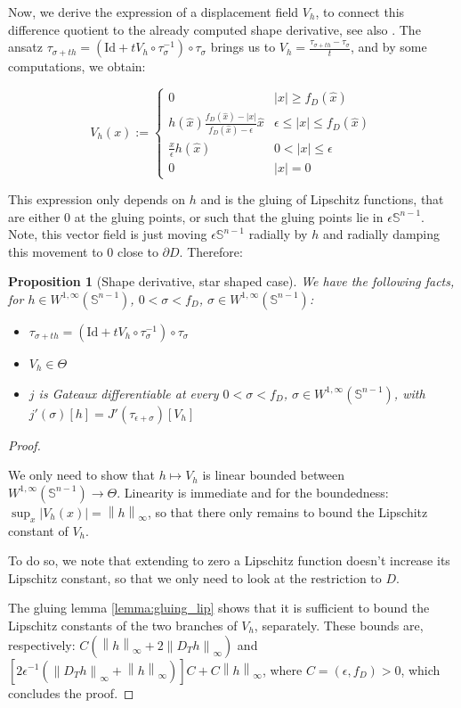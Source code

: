 \documentclass[english,a4paper,9pt,oneside]{scrbook}	%
\theoremstyle{break}
\newtheorem{prop}[equation]{Proposition}
\newenvironment{mproof}[1][\proofname]{%
  \begin{proof}[#1]$ $\par\nobreak\ignorespaces
}{%
  \end{proof}
}
\renewcommand*{\proofname}{Proof}
\theoremstyle{remark}
\newcommand{\mS}{\mathbb{S}^{n-1}}
\newcommand{\ds}{\displaystyle}
\newcommand{\norm}[1]{\left\lVert#1\right\rVert}
\newcommand{\id}{\text{Id}}
\newcommand{\Te}{\Theta}
\newcommand{\xh}{\hat{x}}
\newcommand{\eps}{\epsilon}
\begin{document}
Now, we derive the expression of a displacement field $V_h$, to connect this difference quotient to the already computed shape derivative, see also \cite{deckelnick}. The ansatz $\tau_{\sigma+th}=(\id + tV_h\circ \tau_\sigma^{-1})\circ \tau_\sigma$ brings us to $V_h = \ds \frac{\tau_{\sigma+th}-\tau_\sigma}{t}$, and by some computations, we obtain: 

$$V_h(x) :=\left\{\begin{matrix}
 0 & |x|\geq f_D(\xh)\\ 
 h(\xh)\frac{f_D(\xh)-|x|}{f_D(\xh)-\eps}\xh & \eps \leq |x| \leq f_D(\xh) \\ 
 \frac{x}{\epsilon}h(\hat{x}) & 0<|x|\leq \eps\\ 
 0 & |x|=0
\end{matrix}\right.$$

This expression only depends on $h$ and is the gluing of Lipschitz functions, that are either $0$ at the gluing points, or such that the gluing points lie in $\eps\mS$. Note, this vector field is just moving $\eps \mS$ radially by $h$ and radially damping this movement to $0$ close to $\partial D$. Therefore:

\begin{prop}[Shape derivative, star shaped case]
\label{prop:star_shaped_gradient}
We have the following facts, for $h \in W^{1,\infty}(\mS)$, $0<\sigma<f_D$, $\sigma \in W^{1,\infty}(\mS)$:

\begin{itemize}
	\item $\tau_{\sigma+th}=(\id + tV_h\circ \tau_\sigma^{-1})\circ \tau_\sigma$
	\item $V_h \in \Te$
	\item $j$ is Gateaux differentiable at every $0<\sigma<f_D$, $\sigma \in W^{1,\infty}(\mS)$, with $j'(\sigma)[h] = J'(\tau_{\eps+\sigma})[V_h]$
\end{itemize}

\end{prop}
\begin{mproof}

We only need to show that $h\mapsto V_h$ is linear bounded between $W^{1,\infty}(\mS)\rightarrow \Te$. Linearity is immediate and for the boundedness: $\sup_x|V_h(x)| = \norm{h}_\infty$, so that there only remains to bound the Lipschitz constant of $V_h$. 

To do so, we note that extending to zero a Lipschitz function doesn't increase its Lipschitz constant, so that we only need to look at the restriction to $D$.

The gluing lemma \cref{lemma:gluing_lip} shows that it is sufficient to bound the Lipschitz constants of the two branches of $V_h$, separately.
These bounds are, respectively: $C(\norm{h}_\infty + 2\norm{D_T h}_\infty)$ and $[2\eps^{-1}(\norm{D_T h}_\infty + \norm{h}_\infty)]C+C\norm{h}_\infty$, where $C=(\eps, f_D)>0$, which concludes the proof.
\end{mproof}
\end{document}
